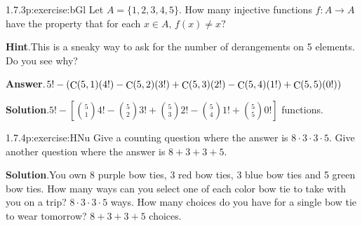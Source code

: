 \documentclass[twoside,11pt,]{book}
\newcommand{\blocktitlefont}{\relax}
\numberwithin{equation}{chapter}
\begin{document}
\begin{divisionsolution}{1.7.3}{}{p:exercise:bGl}%
Let \(A = \{1,2,3,4,5\}\text{.}\) How many injective functions \(f:A \to A\) have the property that for each \(x \in A\text{,}\) \(f(x) \ne x\text{?}\)%
\par\smallskip%
\noindent\textbf{\blocktitlefont Hint}.\quad{}This is a sneaky way to ask for the number of derangements on 5 elements.  Do you see why?%
\par\smallskip%
\noindent\textbf{\blocktitlefont Answer}.\quad{}\(5!-\left(\mathop{\rm C}\nolimits\!\left(5,1\right)\!\left(4!\right)-\mathop{\rm C}\nolimits\!\left(5,2\right)\!\left(3!\right)+\mathop{\rm C}\nolimits\!\left(5,3\right)\!\left(2!\right)-\mathop{\rm C}\nolimits\!\left(5,4\right)\!\left(1!\right)+\mathop{\rm C}\nolimits\!\left(5,5\right)\!\left(0!\right)\right)\)%
\par\smallskip%
\noindent\textbf{\blocktitlefont Solution}.\quad{}\(5! - \left[{5 \choose 1}4! - {5 \choose 2}3! + {5 \choose 3}2! - {5 \choose 4}1! + {5 \choose 5}0!\right]\) functions.%
\end{divisionsolution}%
\begin{divisionsolution}{1.7.4}{}{p:exercise:HNu}%
Give a counting question where the answer is \(8\cdot 3 \cdot 3 \cdot 5\). Give another question where the answer is \(8 + 3 + 3 + 5\).%
\par\smallskip%
\noindent\textbf{\blocktitlefont Solution}.\quad{}You own 8 purple bow ties,  3 red bow ties, 3 blue bow ties and 5 green bow ties. How many ways can you select one of each color bow tie to take with you on a trip? \(8 \cdot 3 \cdot 3 \cdot 5\) ways. How many choices do you have for a single bow tie to wear tomorrow? \(8 + 3 + 3 + 5\) choices.%
\end{divisionsolution}%
\end{document}
